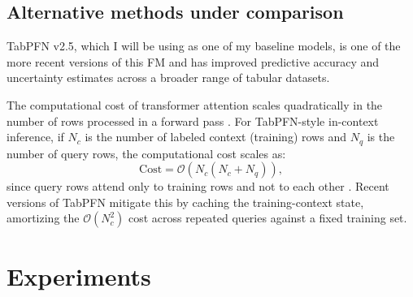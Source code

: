 \documentclass[11pt]{article}
\begin{document}

\subsection{Alternative methods under comparison}
\label{sec:alternatives}

TabPFN v2.5, which I will be using as one of my baseline models, is one of the more recent versions of this FM and has improved predictive accuracy and uncertainty estimates across a broader range of tabular datasets.

The computational cost of transformer attention scales quadratically in the number of rows processed in a forward pass \cite{lin2021surveytransformers}. For TabPFN-style in-context inference, if $N_c$ is the number of labeled context (training) rows and $N_q$ is the number of query rows, the computational cost scales as:
\begin{equation}
    \mathrm{Cost} = \mathcal{O}\!\left(N_c(N_c+N_q)\right),
\end{equation}
since query rows attend only to training rows and not to each other \cite{Hollmann2025NatureTabPFN}. Recent versions of TabPFN mitigate this by caching the training-context state, amortizing the $\mathcal{O}(N_c^2)$ cost across repeated queries against a fixed training set.

\section{Experiments}
\label{sec:progress}

\end{document}
